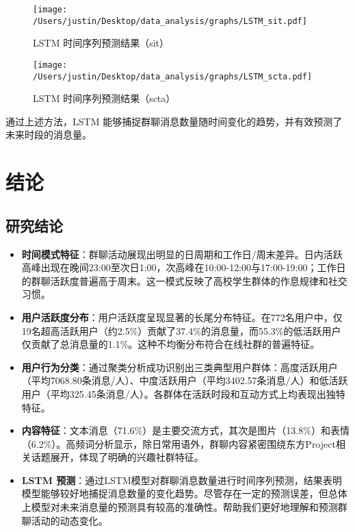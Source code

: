 \documentclass{paper}
\begin{document}
\begin{figure}[H]
    \centering
    \texttt{[image: /Users/justin/Desktop/data\_analysis/graphs/LSTM\_sit.pdf]}
    \caption{LSTM 时间序列预测结果（sit）}
    \label{fig:lstm_sit}
\end{figure}

\begin{figure}[H]
    \centering
    \texttt{[image: /Users/justin/Desktop/data\_analysis/graphs/LSTM\_scta.pdf]}
    \caption{LSTM 时间序列预测结果（scta）}
    \label{fig:lstm_scta}
\end{figure}

通过上述方法，LSTM 能够捕捉群聊消息数量随时间变化的趋势，并有效预测了未来时段的消息量。

\section{结论}
\subsection{研究结论}
\begin{itemize}
    \item \textbf{时间模式特征}：群聊活动展现出明显的日周期和工作日/周末差异。日内活跃高峰出现在晚间23:00至次日1:00，次高峰在10:00-12:00与17:00-19:00；工作日的群聊活跃度普遍高于周末。这一模式反映了高校学生群体的作息规律和社交习惯。

    \item \textbf{用户活跃度分布}：用户活跃度呈现显著的长尾分布特征。在772名用户中，仅19名超高活跃用户（约2.5\%）贡献了37.4\%的消息量，而55.3\%的低活跃用户仅贡献了总消息量的1.1\%。这种不均衡分布符合在线社群的普遍特征。

    \item \textbf{用户行为分类}：通过聚类分析成功识别出三类典型用户群体：高度活跃用户（平均7068.80条消息/人）、中度活跃用户（平均3402.57条消息/人）和低活跃用户（平均325.45条消息/人）。各群体在活跃时段和互动方式上均表现出独特特征。

    \item \textbf{内容特征}：文本消息（71.6\%）是主要交流方式，其次是图片（13.8\%）和表情（6.2\%）。高频词分析显示，除日常用语外，群聊内容紧密围绕东方Project相关话题展开，体现了明确的兴趣社群特征。
    
    \item \textbf{LSTM 预测}：通过LSTM模型对群聊消息数量进行时间序列预测，结果表明模型能够较好地捕捉消息数量的变化趋势。尽管存在一定的预测误差，但总体上模型对未来消息量的预测具有较高的准确性。帮助我们更好地理解和预测群聊活动的动态变化。
\end{itemize}
\end{document}
